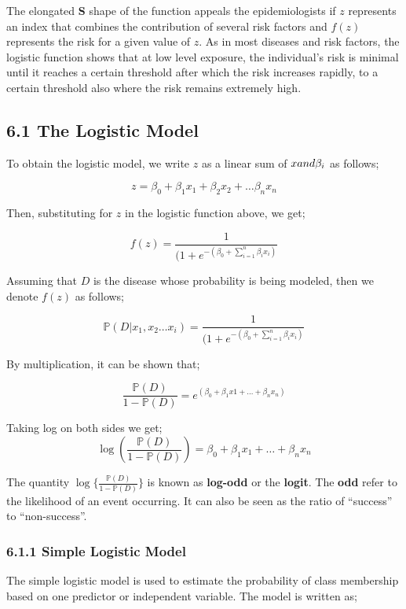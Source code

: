 \documentclass[
]{article}
\begin{document}
The elongated \textbf{S} shape of the function appeals the
epidemiologists if \(z\) represents an index that combines the
contribution of several risk factors and \(f(z)\) represents the risk
for a given value of \(z\). As in most diseases and risk factors, the
logistic function shows that at low level exposure, the individual's
risk is minimal until it reaches a certain threshold after which the
risk increases rapidly, to a certain threshold also where the risk
remains extremely high.

\newpage

\hypertarget{the-logistic-model}{%
\subsection{6.1 The Logistic Model}\label{the-logistic-model}}

To obtain the logistic model, we write \(z\) as a linear sum of
\(x\space\space and \space\space \beta_i\) as follows;

\[z=\beta_0+\beta_1x_1+\beta_2x_2+\dots\beta_nx_n\]

Then, substituting for \(z\) in the logistic function above, we get;

\[f(z)=\frac{1}{(1+e^{-(\beta_0+\sum_{i=1}^n\beta_i x_i)}}\]

Assuming that \(D\) is the disease whose probability is being modeled,
then we denote \(f(z)\) as follows;

\[\mathbb{P}(D|x_1,x_2\dots x_i)=\frac{1}{(1+e^{-(\beta_0+\sum_{i=1}^n\beta_i x_i)}}\]

By multiplication, it can be shown that;

\[\frac{\mathbb{P}(D)}{1-\mathbb{P}(D)}=e^{(\beta_0+\beta_1x1+\dots+\beta_nx_n)}\]

Taking log on both sides we get;
\[\log(\frac{\mathbb{P}(D)}{1-\mathbb{P}(D)})=\beta_0+\beta_1x_1+\dots+\beta_nx_n\]

The quantity \(\log\{\frac{\mathbb{P}(D)}{1-\mathbb{P}(D)}\}\) is known
as \textbf{log-odd} or the \textbf{logit}. The \textbf{odd} refer to the
likelihood of an event occurring. It can also be seen as the ratio of
``success'' to ``non-success''.

\hypertarget{simple-logistic-model}{%
\subsubsection{6.1.1 Simple Logistic
Model}\label{simple-logistic-model}}

The simple logistic model is used to estimate the probability of class
membership based on one predictor or independent variable. The model is
written as;
\end{document}
